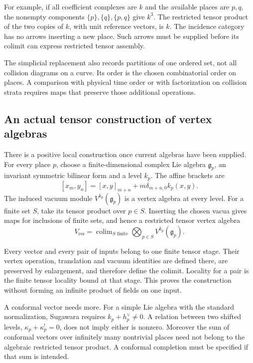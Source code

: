 For example, if all coefficient complexes are \(k\) and the available places
are \(p,q\), the nonempty components \(\{p\},\{q\},\{p,q\}\) give \(k^3\).
The restricted tensor product of the two copies of \(k\), with unit
reference vectors, is \(k\). The incidence category has no arrows inserting
a new place. Such arrows must be supplied before its colimit can express
restricted tensor assembly.

The simplicial replacement also records partitions of one ordered set, not
all collision diagrams on a curve. Its order is the chosen combinatorial
order on places. A comparison with physical time order or with factorization
on collision strata requires maps that preserve those additional operations.

\subsection{An actual tensor construction of vertex algebras}

There is a positive local construction once current algebras have been
supplied. For every place \(p\), choose a finite-dimensional complex Lie
algebra \(\mathfrak g_p\), an invariant symmetric bilinear form and a level
\(k_p\). The affine brackets are
\[
 [x_m,y_n]=[x,y]_{m+n}
       +m\delta_{m+n,0}k_p(x,y).
\]
The induced vacuum module \(V^{k_p}(\mathfrak g_p)\) is a vertex algebra at
every level. For a finite set \(S\), take its tensor product over \(p\in
S\). Inserting the chosen vacua gives maps for inclusions of finite sets,
and hence a restricted tensor vertex algebra
\begin{equation}
 V_{\mathrm{res}}=\operatorname{colim}_{S\text{ finite}}
                    \bigotimes_{p\in S}V^{k_p}(\mathfrak g_p).
 \label{v4-arith:cs:eq:restricted-current}
\end{equation}

Every vector and every pair of inputs belong to one finite tensor stage.
Their vertex operation, translation and vacuum identities are defined there,
are preserved by enlargement, and therefore define the colimit. Locality for
a pair is the finite tensor locality bound at that stage. This proves the
construction without forming an infinite product of fields on one input.

A conformal vector needs more. For a simple Lie algebra with the standard
normalization, Sugawara requires \(k_p+h_p^\vee\ne0\). A relation between
two shifted levels, \(\kappa_p+\kappa_p^!=0\), does not imply either is
nonzero. Moreover the sum of conformal vectors over infinitely many
nontrivial places need not belong to the algebraic restricted tensor
product. A conformal completion must be specified if that sum is intended.

